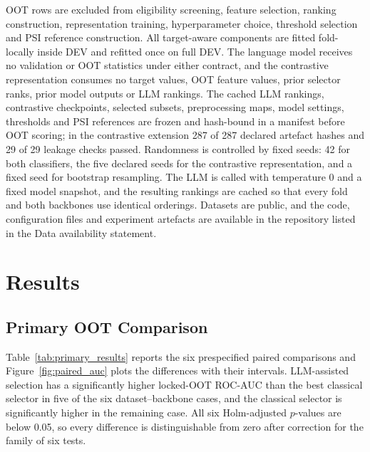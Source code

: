 \documentclass[preprint,12pt]{elsarticle}
\begin{document}
OOT rows are excluded from eligibility screening, feature selection, ranking construction, representation training, hyperparameter choice, threshold selection and PSI reference construction. All target-aware components are fitted fold-locally inside DEV and refitted once on full DEV. The language model receives no validation or OOT statistics under either contract, and the contrastive representation consumes no target values, OOT feature values, prior selector ranks, prior model outputs or LLM rankings. The cached LLM rankings, contrastive checkpoints, selected subsets, preprocessing maps, model settings, thresholds and PSI references are frozen and hash-bound in a manifest before OOT scoring; in the contrastive extension 287 of 287 declared artefact hashes and 29 of 29 leakage checks passed. Randomness is controlled by fixed seeds: 42 for both classifiers, the five declared seeds for the contrastive representation, and a fixed seed for bootstrap resampling. The LLM is called with temperature 0 and a fixed model snapshot, and the resulting rankings are cached so that every fold and both backbones use identical orderings. Datasets are public, and the code, configuration files and experiment artefacts are available in the repository listed in the Data availability statement.


\section{Results}
\label{sec:results}

\subsection{Primary OOT Comparison}
\label{subsec:primary_results}

Table~\ref{tab:primary_results} reports the six prespecified paired comparisons and Figure~\ref{fig:paired_auc} plots the differences with their intervals. LLM-assisted selection has a significantly higher locked-OOT ROC-AUC than the best classical selector in five of the six dataset--backbone cases, and the classical selector is significantly higher in the remaining case. All six Holm-adjusted $p$-values are below 0.05, so every difference is distinguishable from zero after correction for the family of six tests.
\end{document}
